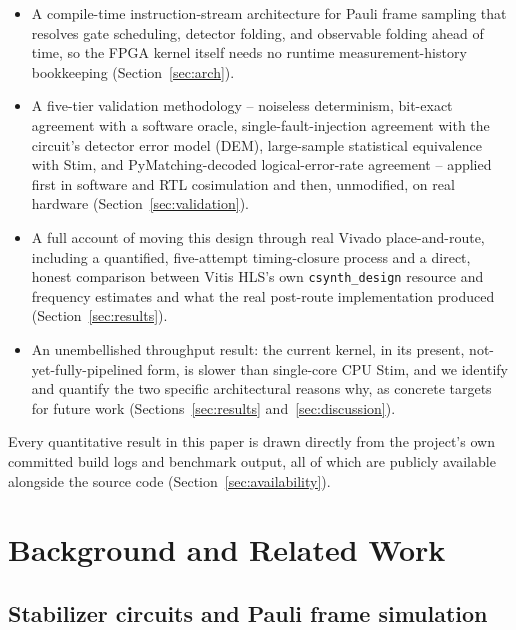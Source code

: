 \documentclass[pdflatex,sn-basic]{sn-jnl}
\begin{document}
\begin{itemize}
\item A compile-time instruction-stream architecture for Pauli frame sampling that resolves gate scheduling, detector folding, and observable folding ahead of time, so the FPGA kernel itself needs no runtime measurement-history bookkeeping (Section~\ref{sec:arch}).
\item A five-tier validation methodology -- noiseless determinism, bit-exact agreement with a software oracle, single-fault-injection agreement with the circuit's detector error model (DEM), large-sample statistical equivalence with Stim, and PyMatching-decoded logical-error-rate agreement -- applied first in software and RTL cosimulation and then, unmodified, on real hardware (Section~\ref{sec:validation}).
\item A full account of moving this design through real Vivado place-and-route, including a quantified, five-attempt timing-closure process and a direct, honest comparison between Vitis HLS's own \texttt{csynth\_design} resource and frequency estimates and what the real post-route implementation produced (Section~\ref{sec:results}).
\item An unembellished throughput result: the current kernel, in its present, not-yet-fully-pipelined form, is slower than single-core CPU Stim, and we identify and quantify the two specific architectural reasons why, as concrete targets for future work (Sections~\ref{sec:results} and~\ref{sec:discussion}).
\end{itemize}

Every quantitative result in this paper is drawn directly from the project's own committed build logs and benchmark output, all of which are publicly available alongside the source code (Section~\ref{sec:availability}).

\section{Background and Related Work}\label{sec2}

\subsection{Stabilizer circuits and Pauli frame simulation}
\end{document}
